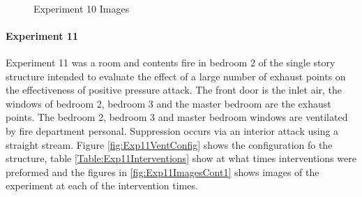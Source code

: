 \documentclass{article}
\begin{document}
\begin{figure}[H]
	\ContinuedFloat 
	\centering 
	 \ 
	 \ 
	\caption{Experiment 10 Images}
	\label{fig:Experiment10ImagesCont3} 
\end{figure}

\paragraph{Experiment 11}\mbox{}

Experiment 11 was a room and contents fire in bedroom 2 of the single story structure intended to evaluate the effect of a large number of exhaust points on the effectiveness of positive pressure attack. The front door is the inlet air, the windows of bedroom 2, bedroom 3 and the master bedroom are the exhaust points. The bedroom 2, bedroom 3 and master bedroom windows are ventilated by fire department personal. Suppression occurs via an interior attack using a straight stream. Figure \ref{fig:Exp11VentConfig} shows the configuration fo the structure, table \ref{Table:Exp11Interventions} show at what times interventions were preformed and the figures in \ref{fig:Exp11ImagesCont1} shows images of the experiment at each of the intervention times.
\end{document}
